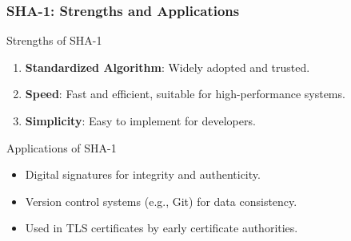 \documentclass{beamer}
\begin{document}
\begin{frame}[fragile]
    \frametitle{SHA-1: Strengths and Applications}
    \begin{block}{Strengths of SHA-1}
        \begin{enumerate}
            \item \textbf{Standardized Algorithm}: Widely adopted and trusted.
            \item \textbf{Speed}: Fast and efficient, suitable for high-performance systems.
            \item \textbf{Simplicity}: Easy to implement for developers.
        \end{enumerate}
    \end{block}

    \begin{block}{Applications of SHA-1}
        \begin{itemize}
            \item Digital signatures for integrity and authenticity.
            \item Version control systems (e.g., Git) for data consistency.
            \item Used in TLS certificates by early certificate authorities.
        \end{itemize}
    \end{block}
\end{frame}
\end{document}
